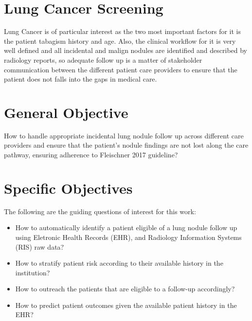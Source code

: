 \section{Lung Cancer Screening}

Lung Cancer is of particular interest as the two most important factors for it is the patient tabagism history and age\cite{fleischner2017}. Also, the clinical workflow for it is very well defined and all incidental and malign nodules are identified and described by radiology reports, so adequate follow up is a matter of stakeholder communication between the different patient care providers to ensure that the patient does not falls into the gaps in medical care. 

\section{General Objective}

How to handle appropriate incidental lung nodule follow up across different care providers and ensure that the patient's nodule findings are not lost along the care pathway, ensuring adherence to Fleischner 2017 guideline?

\section{Specific Objectives}

The following are the guiding questions of interest for this work:

\begin{itemize}
  \item How to automatically identify a patient eligible of a lung nodule follow up using Eletronic Health Records (EHR), and Radiology Information Systems (RIS) raw data?
  \item How to stratify patient risk according to their available history in the institution?
  \item How to outreach the patients that are eligible to a follow-up accordingly? 
  \item How to predict patient outcomes given the available patient history in the EHR?
\end{itemize}
